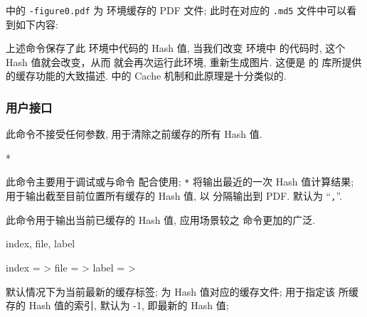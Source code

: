 \documentclass[
  hyper, lang=cn, 
  class=l3dox, 
]{../../zlatex/code/ztex}
\begin{document}
 中的 \texttt{-figure0.pdf} 为  环境缓存的 PDF 文件; 
此时在对应的 \texttt{.md5} 文件中可以看到如下内容:


\begin{DocExample}
\def \tikzexternallastkey {AE7F2539E81C96848ADCCEE3994993D1}%
\end{DocExample}
\resetExampleUR


上述命令保存了此  环境中代码的 Hash 值, 当我们改变  环境中
的代码时, 这个 Hash 值就会改变，从而 \TikZ{} 就会再次运行此环境, 重新生成图片. 这便是 \TikZ{} 的
 库所提供的缓存功能的大致描述. \zTikZ{} 中的 Cache 机制和此原理是十分类似的.

\subsubsection{用户接口}
\begin{function}[added=2025-05-15]{\ztikzHashClean}
  此命令不接受任何参数, 用于清除之前缓存的所有 Hash 值.
\end{function}


\begin{function}[added=2025-05-15]{\ztikzHashCurrent}
  \begin{syntax}
    *
  \end{syntax}
  此命令主要用于调试或与命令  配合使用; \texttt{*} 将输出最近的一次 Hash 值计算结果;
   用于输出截至目前位置所有缓存的 Hash 值, 以  分隔输出到 PDF.
   默认为 ``\texttt{,}''.
\end{function}


\begin{function}[added=2025-05-29, EXP]{\ztikzCachedHash}
  \begin{syntax}
  \end{syntax}
  此命令用于输出当前已缓存的 Hash 值, 应用场景较之  命令更加的广泛.
\end{function}


\begin{keyval}[parent=ztikz/cache/hash]{index, file, label}
  \begin{syntax}
    index = >
    file  = >
    label = >
  \end{syntax}
   默认情况下为当前最新的缓存标签;  为 Hash 值对应的缓存文件;
   用于指定该  所缓存的 Hash 值的索引, 默认为 -1, 即最新的 Hash 值;
\end{keyval}
\end{document}
